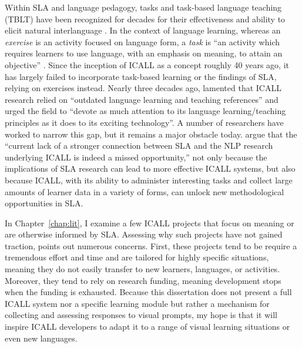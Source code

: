 Within SLA and language pedagogy, tasks and task-based language teaching (TBLT) have been recognized for decades for their effectiveness and ability to elicit natural interlanguage \cite{ellis2003task}. In the context of language learning, whereas an \textit{exercise} is an activity focused on language form, a \textit{task} is ``an activity which requires learners to use language, with an emphasis on meaning, to attain an objective'' \cite{bygate2001researching}. Since the inception of ICALL as a concept roughly 40 years ago, it has largely failed to incorporate task-based learning or the findings of SLA, relying on exercises instead. Nearly three decades ago, \citet{oxford1993intelligent} lamented that ICALL research relied on ``outdated language learning and teaching references'' and urged the field to ``devote as much attention to its language learning/teaching principles as it does to its exciting technology''. A number of researchers have worked to narrow this gap, but it remains a major obstacle today. \citet{ziegler2017interdisciplinary} argue that the ``current lack of a stronger connection between SLA and the NLP research underlying ICALL is indeed a missed opportunity,'' not only because the implications of SLA research can lead to more effective ICALL systems, but also because ICALL, with its ability to administer interesting tasks and collect large amounts of learner data in a variety of forms, can unlock new methodological opportunities in SLA.

In Chapter~\ref{chap:lit}, I examine a few ICALL projects that focus on meaning or are otherwise informed by SLA. Assessing why such projects have not gained traction, \citet{schulze2010taking} points out numerous concerns. First, these projects tend to be require a tremendous effort and time and are tailored for highly specific situations, meaning they do not easily transfer to new learners, languages, or activities. Moreover, they tend to rely on research funding, meaning development stops when the funding is exhausted. Because this dissertation does not present a full ICALL system nor a specific learning module but rather a mechanism for collecting and assessing responses to visual prompts, my hope is that it will inspire ICALL developers to adapt it to a range of visual learning situations or even new languages.

